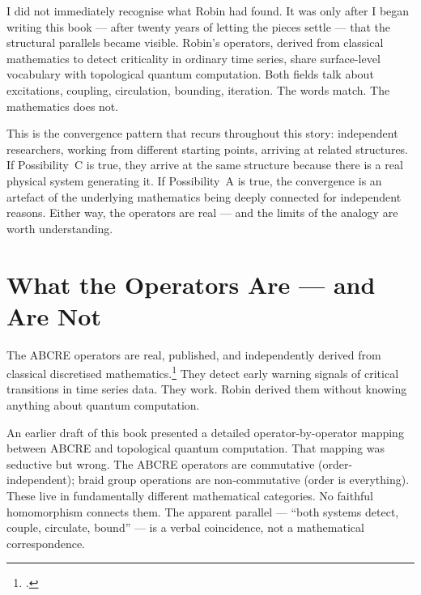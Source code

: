 I did not immediately recognise what Robin had found. It was only after I began writing this book --- after twenty years of letting the pieces settle --- that the structural parallels became visible. Robin's operators, derived from classical mathematics to detect criticality in ordinary time series, share surface-level vocabulary with topological quantum computation. Both fields talk about excitations, coupling, circulation, bounding, iteration. The words match. The mathematics does not.

This is the convergence pattern that recurs throughout this story: independent researchers, working from different starting points, arriving at related structures. If Possibility~C is true, they arrive at the same structure because there is a real physical system generating it. If Possibility~A is true, the convergence is an artefact of the underlying mathematics being deeply connected for independent reasons. Either way, the operators are real --- and the limits of the analogy are worth understanding.

\section*{What the Operators Are --- and Are Not}
\label{pos20:the-operator-mapping}


The ABCRE operators are real, published, and independently derived from classical discretised mathematics.\footcite{stephenson2025} They detect early warning signals of critical transitions in time series data. They work. Robin derived them without knowing anything about quantum computation.

An earlier draft of this book presented a detailed operator-by-operator mapping between ABCRE and topological quantum computation. That mapping was seductive but wrong. The ABCRE operators are commutative (order-independent); braid group operations are non-commutative (order is everything). These live in fundamentally different mathematical categories. No faithful homomorphism connects them. The apparent parallel --- ``both systems detect, couple, circulate, bound'' --- is a verbal coincidence, not a mathematical correspondence.

